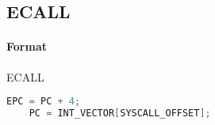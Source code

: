 \subsection{ECALL}


\paragraph{Format} ECALL

\begin{lstlisting}[language=C]
    EPC = PC + 4;
    PC = INT_VECTOR[SYSCALL_OFFSET];
\end{lstlisting}